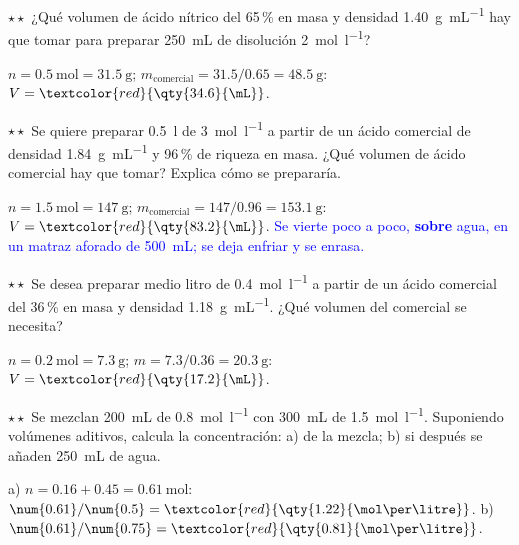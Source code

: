 \begin{exercise}
    \(\star\star\) ¿Qué volumen de ácido nítrico del 65\,\% en masa y densidad \qty{1.40}{\gram\per\mL} hay que tomar para
    preparar \qty{250}{\mL} de disolución \qty{2}{\mol\per\litre}?
    \begin{solu}
        \(n = \qty{0.5}{\mol} = \qty{31.5}{\gram}\); \(m_{\text{comercial}} = \num{31.5}/\num{0.65} = \qty{48.5}{\gram}\):
        \(V = \textcolor{red}{\qty{34.6}{\mL}}\).
    \end{solu}
\end{exercise}

\begin{exercise}
    \(\star\star\) Se quiere preparar \qty{0.5}{\litre} de  \qty{3}{\mol\per\litre} a partir de un ácido comercial de
    densidad \qty{1.84}{\gram\per\mL} y 96\,\% de riqueza en masa. ¿Qué volumen de ácido comercial hay que tomar? Explica cómo se
    prepararía.
    \begin{solu}
        \(n = \qty{1.5}{\mol} = \qty{147}{\gram}\); \(m_{\text{comercial}} = 147/\num{0.96} = \qty{153.1}{\gram}\):
        \(V = \textcolor{red}{\qty{83.2}{\mL}}\). \textcolor{blue}{Se vierte poco a poco, \textbf{sobre} agua, en un matraz aforado de
        \qty{500}{\mL}; se deja enfriar y se enrasa.}
    \end{solu}
\end{exercise}

\begin{exercise}
    \(\star\star\) Se desea preparar medio litro de  \qty{0.4}{\mol\per\litre} a partir de un ácido comercial del 36\,\% en
    masa y densidad \qty{1.18}{\gram\per\mL}. ¿Qué volumen del comercial se necesita?
    \begin{solu}
        \(n = \qty{0.2}{\mol} = \qty{7.3}{\gram}\); \(m = \num{7.3}/\num{0.36} = \qty{20.3}{\gram}\): \(V = \textcolor{red}{\qty{17.2}{\mL}}\).
    \end{solu}
\end{exercise}

\begin{exercise}
    \(\star\star\) Se mezclan \qty{200}{\mL} de  \qty{0.8}{\mol\per\litre} con \qty{300}{\mL} de 
    \qty{1.5}{\mol\per\litre}. Suponiendo volúmenes aditivos, calcula la concentración: a) de la mezcla; b) si después se añaden
    \qty{250}{\mL} de agua.
    \begin{solu}
        a) \(n = \num{0.16} + \num{0.45} = \qty{0.61}{\mol}\): \(\num{0.61}/\num{0.5} = \textcolor{red}{\qty{1.22}{\mol\per\litre}}\).
        b) \(\num{0.61}/\num{0.75} = \textcolor{red}{\qty{0.81}{\mol\per\litre}}\).
    \end{solu}
\end{exercise}

